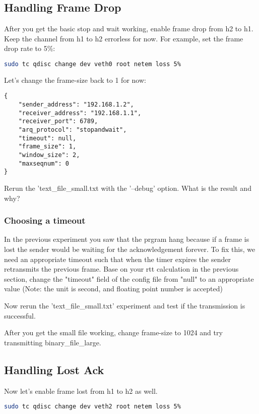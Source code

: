 \documentclass[11pt]{article}
\begin{document}
\subsection{Handling Frame Drop}
After you get the basic stop and wait working, enable frame drop from h2 to h1. Keep the channel from h1 to h2 errorless for now. For example, set the frame drop rate to 5\%:
\begin{lstlisting}[language=bash]
sudo tc qdisc change dev veth0 root netem loss 5%
\end{lstlisting}
Let's change the frame-size back to 1 for now:

\begin{minipage}{\linewidth}
\begin{lstlisting}[caption={Configuration For Large File}]
{
    "sender_address": "192.168.1.2",
    "receiver_address": "192.168.1.1",
    "receiver_port": 6789,
    "arq_protocol": "stopandwait",
    "timeout": null,
    "frame_size": 1,
    "window_size": 2,
    "maxseqnum": 0
}
\end{lstlisting}
\end{minipage}
Rerun the 'text\_file\_small.txt with the '--debug' option. What is the result and why?
\subsubsection {Choosing a timeout}
In the previous experiment you saw that the prgram hang because if a frame is lost the sender would be waiting for the acknowledgement forever. To fix this, we need an appropriate timeout such that when the timer expires the sender retransmits the previous frame. Base on your rtt calculation in the previous section, change the "timeout" field of the config file from "null" to an appropriate value (Note: the unit is second, and floating point number is accepted)


\noindent Now rerun the 'text\_file\_small.txt' experiment and test if the transmission is successful.

\noindent After you get the small file working, change frame-size to 1024 and try transmitting binary\_file\_large.


\subsection {Handling Lost Ack}
Now let's enable frame lost from h1 to h2 as well.
\begin{lstlisting}[language=bash]
sudo tc qdisc change dev veth2 root netem loss 5%
\end{lstlisting}
\end{document}

